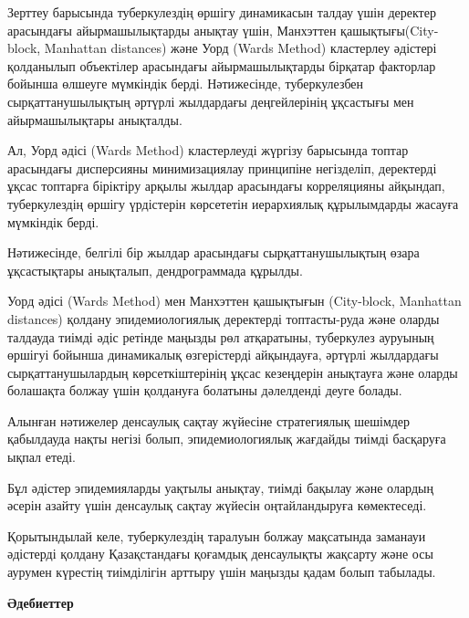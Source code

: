 \begin{multicols}{2}
Зерттеу барысында туберкулездің өршігу динамикасын талдау үшін деректер
арасындағы айырмашылықтарды анықтау үшін, Манхэттен
қашықтығы(City-block, Manhattan distances) және Уорд
(Ward\textquotesingle s Method) кластерлеу әдістері қолданылып
объектілер арасындағы айырмашылықтарды бірқатар факторлар бойынша
өлшеуге мүмкіндік берді. Нәтижесінде, туберкулезбен сырқаттанушылықтың
әртүрлі жылдардағы деңгейлерінің ұқсастығы мен айырмашылықтары
анықталды.

Ал, Уорд әдісі (Ward\textquotesingle s Method) кластерлеуді жүргізу
барысында топтар арасындағы дисперсияны минимизациялау принципіне
негізделіп, деректерді ұқсас топтарға біріктіру арқылы жылдар арасындағы
корреляцияны айқындап, туберкулездің өршігу үрдістерін көрсететін
иерархиялық құрылымдарды жасауға мүмкіндік берді.

Нәтижесінде, белгілі бір жылдар арасындағы сырқаттанушылықтың өзара
ұқсастықтары анықталып, дендрограммада құрылды.

Уорд әдісі (Ward\textquotesingle s Method) мен Манхэттен қашықтығын
(City-block, Manhattan distances) қолдану эпидемиологиялық деректерді
топтасты-руда және оларды талдауда тиімді әдіс ретінде маңызды рөл
атқаратыны, туберкулез ауруының өршігуі бойынша динамикалық өзгерістерді
айқындауға, әртүрлі жылдардағы сырқаттанушылардың көрсеткіштерінің ұқсас
кезеңдерін анықтауға және оларды болашақта болжау үшін қолдануға
болатыны дәлелденді деуге болады.

Алынған нәтижелер денсаулық сақтау жүйесіне стратегиялық шешімдер
қабылдауда нақты негізі болып, эпидемиологиялық жағдайды тиімді
басқаруға ықпал етеді.

Бұл әдістер эпидемияларды уақтылы анықтау, тиімді бақылау және олардың
әсерін азайту үшін денсаулық сақтау жүйесін оңтайландыруға көмектеседі.

Қорытындылай келе, туберкулездің таралуын болжау мақсатында заманауи
әдістерді қолдану Қазақстандағы қоғамдық денсаулықты жақсарту және осы
аурумен күрестің тиімділігін арттыру үшін маңызды қадам болып табылады.

\end{multicols}


\begin{center}
  {\bfseries Әдебиеттер}
  \end{center}

